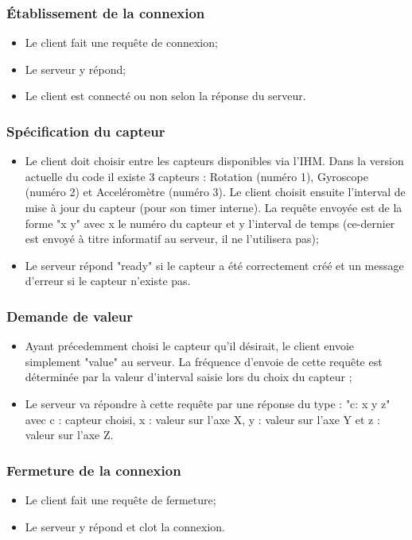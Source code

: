 \subsubsection{Établissement de la connexion}
\begin{itemize}
\item Le client fait une requête de connexion;\\
\item Le serveur y répond;\\
\item Le client est connecté ou non selon la réponse du serveur.\\
\end{itemize}

\subsubsection{Spécification du capteur}
\begin{itemize}
\item Le client doit choisir entre les capteurs disponibles via l'IHM. Dans la version actuelle du code il existe 3 capteurs : Rotation (numéro 1), Gyroscope (numéro 2) et Acceléromètre (numéro 3). Le client choisit ensuite l'interval de mise à jour du capteur (pour son timer interne). La requête envoyée est de la forme "x y" avec x le numéro du capteur et y l'interval de temps (ce-dernier est envoyé à titre informatif au serveur, il ne l'utilisera pas); \\
\item Le serveur répond "ready" si le capteur a été correctement créé et un message d'erreur si le capteur n'existe pas.\\
\end{itemize}

\subsubsection{Demande de valeur}
\begin{itemize}
\item Ayant précedemment choisi le capteur qu'il désirait, le client envoie simplement "value" au serveur. La fréquence d'envoie de cette requête est déterminée par la valeur d'interval saisie lors du choix du capteur ;
\item Le serveur va répondre à cette requête par une réponse du type : "c: x y z" avec c : capteur choisi, x : valeur sur l'axe X, y : valeur sur l'axe Y et z : valeur sur l'axe Z.\\
\end{itemize}

\subsubsection{Fermeture de la connexion}
\begin{itemize}
\item Le client fait une requête de fermeture;\\
\item Le serveur y répond et clot la connexion.\\
\end{itemize}